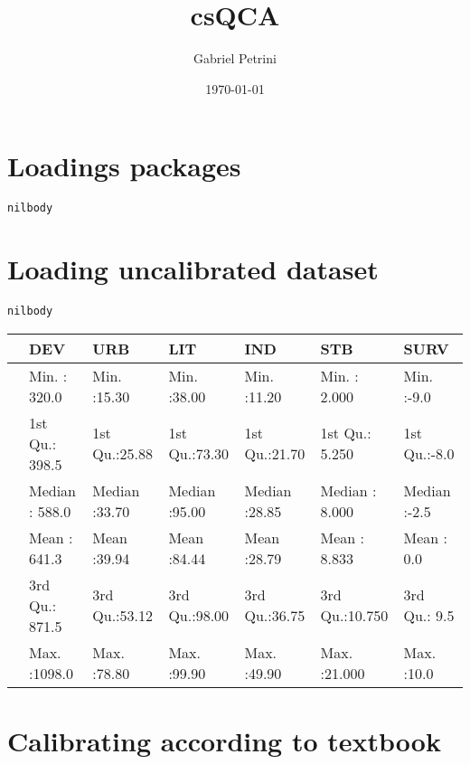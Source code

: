 \documentclass[11pt]{article}
\author{Gabriel Petrini}
\date{\today}
\title{csQCA}
\begin{document}
\maketitle
\tableofcontents

\section{Loadings packages}
\label{sec:org1868fbf}

\begin{verbatim}
nilbody
\end{verbatim}

\section{Loading uncalibrated dataset}
\label{sec:orge8edad1}

\begin{verbatim}
nilbody
\end{verbatim}


\begin{tabular}{l|l|l|l|l|l|l}
\hline
  &      DEV &      URB &      LIT &      IND &      STB &      SURV\\
\hline
 & Min.   : 320.0 & Min.   :15.30 & Min.   :38.00 & Min.   :11.20 & Min.   : 2.000 & Min.   :-9.0\\
\hline
 & 1st Qu.: 398.5 & 1st Qu.:25.88 & 1st Qu.:73.30 & 1st Qu.:21.70 & 1st Qu.: 5.250 & 1st Qu.:-8.0\\
\hline
 & Median : 588.0 & Median :33.70 & Median :95.00 & Median :28.85 & Median : 8.000 & Median :-2.5\\
\hline
 & Mean   : 641.3 & Mean   :39.94 & Mean   :84.44 & Mean   :28.79 & Mean   : 8.833 & Mean   : 0.0\\
\hline
 & 3rd Qu.: 871.5 & 3rd Qu.:53.12 & 3rd Qu.:98.00 & 3rd Qu.:36.75 & 3rd Qu.:10.750 & 3rd Qu.: 9.5\\
\hline
 & Max.   :1098.0 & Max.   :78.80 & Max.   :99.90 & Max.   :49.90 & Max.   :21.000 & Max.   :10.0\\
\hline
\end{tabular}

\section{Calibrating according to textbook}
\label{sec:orgef96a03}
\end{document}
